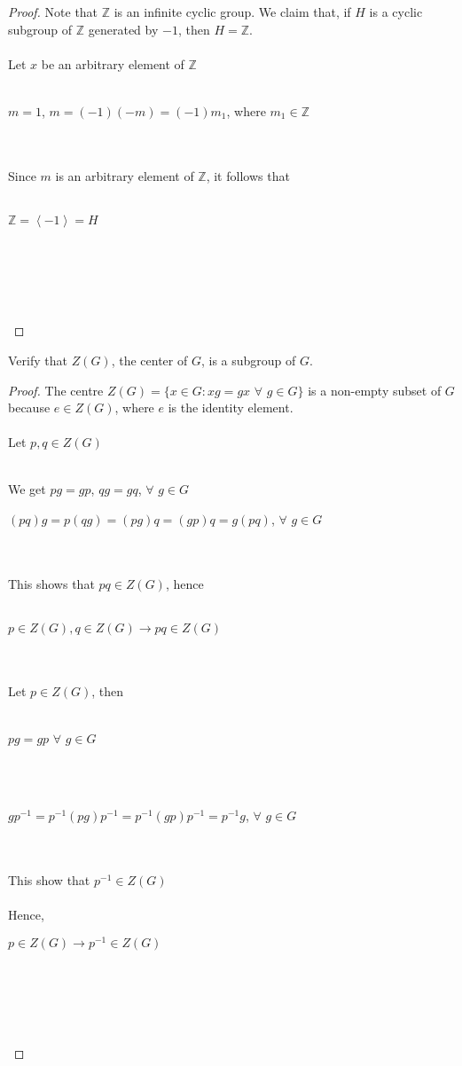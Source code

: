 \documentclass[12pt]{article}
\newenvironment{problem}[2][Problem]{\begin{trivlist}
\item[\hskip \labelsep {\bfseries #1}\hskip \labelsep {\bfseries #2.}]}{\end{trivlist}}
\begin{document}
\begin{proof}
Note that $\mathbb{Z}$ is an infinite cyclic group. We claim that, if $H$ is a cyclic subgroup of $\mathbb{Z}$ generated by $-1$, then $H= \mathbb{Z}$. \\ \\
Let $x$ be an arbitrary element of $\mathbb{Z}$ \\ \\
\centerline{$m=1$, $m=(-1)(-m) = (-1)m_1$, where $m_1 \in \mathbb{Z}$} \\ \\
Since $m$ is an arbitrary element of $\mathbb{Z}$, it follows that \\ \\
\centerline{$\mathbb{Z} = \left<-1\right> = H$} \\ \\
\centerline{} \\ \\
\end{proof}

\begin{problem}{2.3.4}
Verify that $Z(G)$, the center of $G$, is a subgroup of $G$.
\end{problem}

\begin{proof}
The centre $Z(G) = \{x \in G: xg = gx$  $\forall$  $g \in G\}$ is a non-empty subset of $G$ because $e \in Z(G)$, where $e$ is the identity element. \\ \\
Let $p,q \in Z(G)$ \\ \\
\centerline{We get $pg = gp$, $qg=gq$,  $\forall$  $g \in G$}
\centerline{$(pq)g=p(qg)=(pg)q=(gp)q=g(pq)$, $\forall$ $g \in G$} \\ \\
This shows that $pq \in Z(G)$, hence \\ \\
\centerline{$p \in Z(G), q \in Z(G) \rightarrow pq \in Z(G)$} \\ \\
Let $p\in Z(G)$, then \\ \\
\centerline{$pg=gp$ $\forall$ $g \in G$} \\ \\
\centerline{$gp^{-1}=p^{-1}(pg)p^{-1}=p^{-1}(gp)p^{-1}=p^{-1}g$, $\forall$ $g\in G$} \\ \\
This show that $p^{-1} \in Z(G)$ \\ \\
Hence, \\
\centerline{$p \in Z(G) \rightarrow p^{-1} \in Z(G)$} \\ \\
\centerline{} \\ \\
\end{proof}
 
\end{document}
